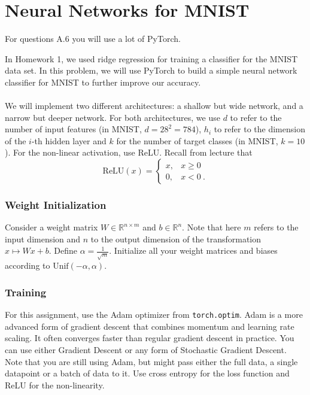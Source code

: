 \documentclass{article}
\begin{document}
\section*{Neural Networks for MNIST}
For questions A.6 you will use a lot of PyTorch.
\begin{aprob}
    \label{code-nn-mnist}
    In Homework 1, we used ridge regression for training a classifier for the MNIST data set.
    In this problem, we will use PyTorch to build a simple neural network classifier for MNIST to further improve our accuracy.\\\\
    We will implement two different architectures: a shallow but wide network, and a narrow but deeper network. For both architectures,
    we use $d$ to refer to the number of input features (in MNIST, $d=28^2 = 784$), $h_i$ to refer to the dimension of the $i$-th hidden layer and $k$ for the number of target classes (in MNIST, $k=10$). For the non-linear activation, use ReLU. Recall from lecture that
    \[ \text{ReLU}(x) = \begin{cases} 
          x, & x \geq 0 \\
          0, & x < 0 \ .
       \end{cases}
    \]
    \subsubsection*{Weight Initialization}
    Consider a weight matrix $W \in \mathbb{R}^{n \times m}$ and $b \in \mathbb{R}^n$. Note that here $m$ refers to the input dimension and
    $n$ to the output dimension of the transformation $x \mapsto Wx + b$. Define $\alpha = \frac{1}{\sqrt{m}}$.
    Initialize all your weight matrices and biases according to $\text{Unif}(-\alpha, \alpha)$.
    
    \subsubsection*{Training}
    For this assignment, use the Adam optimizer from \texttt{torch.optim}. Adam is a more advanced form of gradient descent that combines momentum and learning rate scaling. It often converges faster than regular gradient descent in practice. You can use either Gradient Descent or any form of Stochastic Gradient Descent. Note that you are still using Adam, but might pass either the full data, a single datapoint or a batch of data to it. Use cross entropy for the loss function and ReLU for the non-linearity.

\end{aprob}
\end{document}
